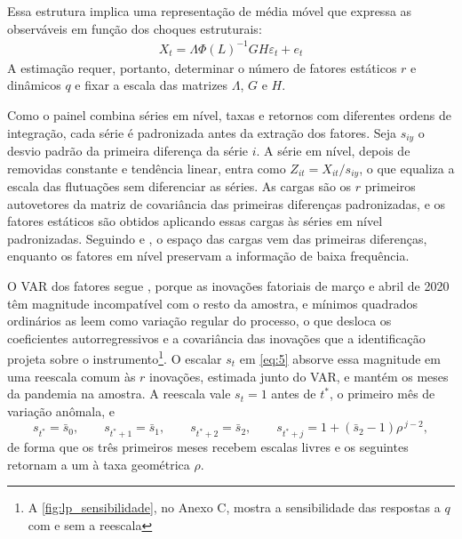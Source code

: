 \documentclass[preprint,authoryear,review,12pt]{elsarticle}
\begin{document}
Essa estrutura implica uma representação de média móvel que expressa as observáveis em função dos choques estruturais:
\begin{align}\label{eq:7}
    X_t=\Lambda \Phi(L)^{-1}GH\varepsilon_t + e_t
\end{align}
A estimação requer, portanto, determinar o número de fatores estáticos $r$ e dinâmicos $q$ e fixar a escala das matrizes $\Lambda$, $G$ e $H$.


Como o painel combina séries em nível, taxas e retornos com diferentes ordens de integração, cada série é padronizada antes da extração dos fatores. Seja $s_{iy}$ o desvio padrão da primeira diferença da série $i$. A série em nível, depois de removidas constante e tendência linear, entra como $Z_{it} = X_{it}/s_{iy}$, o que equaliza a escala das flutuações sem diferenciar as séries. As cargas são os $r$ primeiros autovetores da matriz de covariância das primeiras diferenças padronizadas, e os fatores estáticos são obtidos aplicando essas cargas às séries em nível padronizadas. Seguindo \cite{alessi} e \cite{barigozzi2016non}, o espaço das cargas vem das primeiras diferenças, enquanto os fatores em nível preservam a informação de baixa frequência.

O VAR dos fatores segue \cite{lenzaprimiceri}, porque as inovações fatoriais de março e abril de 2020 têm magnitude incompatível com o resto da amostra, e mínimos quadrados ordinários as leem como variação regular do processo, o que desloca os coeficientes autorregressivos e a covariância das inovações que a identificação projeta sobre o instrumento\footnote{A \autoref{fig:lp_sensibilidade}, no Anexo C, mostra a sensibilidade das respostas a $q$ com e sem a reescala}. O escalar $s_t$ em \ref{eq:5} absorve essa magnitude em uma reescala comum às $r$ inovações, estimada junto do VAR, e mantém os meses da pandemia na amostra. A reescala vale $s_t = 1$ antes de $t^*$, o primeiro mês de variação anômala, e
\begin{equation}\label{eq:5b}
    s_{t^*} = \bar{s}_0, \qquad s_{t^*+1} = \bar{s}_1, \qquad s_{t^*+2} = \bar{s}_2, \qquad s_{t^*+j} = 1 + (\bar{s}_2 - 1)\rho^{\,j-2},
\end{equation}
de forma que os três primeiros meses recebem escalas livres e os seguintes retornam a um à taxa geométrica $\rho$.
\end{document}
